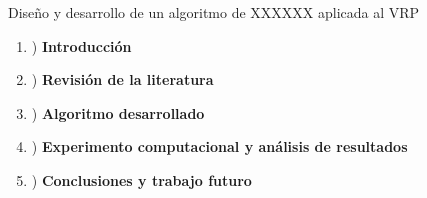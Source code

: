 \documentclass[11pt]{article} %
\begin{document}
\clearpage

{\fontsize{50}{60}\selectfont Diseño y desarrollo de un algoritmo de XXXXXX aplicada al VRP}

\renewcommand{\labelenumi}{\arabic{enumi}}
 \begin{enumerate}
   \item) \textbf{Introducción}\\[0.2cm]

   \item) \textbf{Revisión de la literatura}\\[0.2cm]

   \item) \textbf{Algoritmo desarrollado}\\[0.2cm]

   \item) \textbf{Experimento computacional y análisis de resultados}\\[0.2cm]

   \item) \textbf{Conclusiones y trabajo futuro}\\[0.2cm]


 \end{enumerate}
\end{document}
